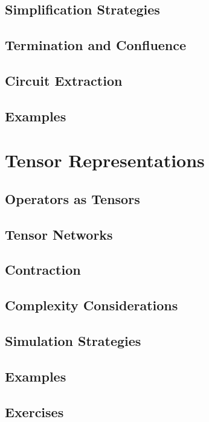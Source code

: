 \documentclass[11pt,a4paper]{article}
\begin{document}
\subsection{Simplification Strategies}

\subsection{Termination and Confluence}

\subsection{Circuit Extraction}

\subsection{Examples}


\section{Tensor Representations}

\subsection{Operators as Tensors}

\subsection{Tensor Networks}

\subsection{Contraction}

\subsection{Complexity Considerations}

\subsection{Simulation Strategies}

\subsection{Examples}

\subsection{Exercises}
\end{document}
